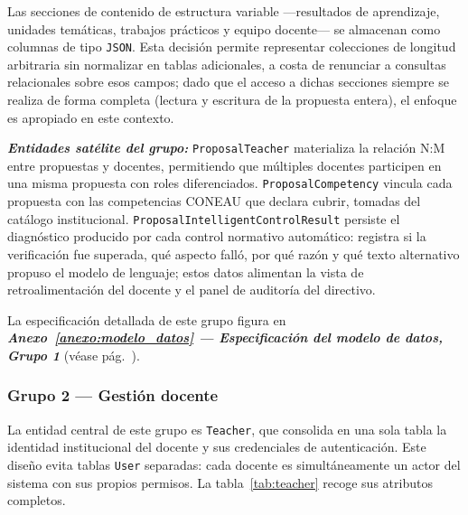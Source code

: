 Las secciones de contenido de estructura variable ---resultados de aprendizaje,
unidades temáticas, trabajos prácticos y equipo docente--- se almacenan como
columnas de tipo \texttt{JSON}. Esta decisión permite representar colecciones de
longitud arbitraria sin normalizar en tablas adicionales, a costa de renunciar a
consultas relacionales sobre esos campos; dado que el acceso a dichas secciones
siempre se realiza de forma completa (lectura y escritura de la propuesta entera),
el enfoque es apropiado en este contexto.

\textbf{\textit{Entidades satélite del grupo:}} \texttt{ProposalTeacher} materializa la relación N:M entre propuestas y docentes,
permitiendo que múltiples docentes participen en una misma propuesta con roles
diferenciados. \texttt{ProposalCompetency} vincula cada propuesta con las
competencias CONEAU que declara cubrir, tomadas del catálogo institucional.
\texttt{ProposalIntelligentControlResult} persiste el diagnóstico producido por
cada control normativo automático: registra si la verificación fue superada,
qué aspecto falló, por qué razón y qué texto alternativo propuso el modelo de
lenguaje; estos datos alimentan la vista de retroalimentación del docente y el
panel de auditoría del directivo.

La especificación detallada de este grupo figura en \textbf{\textit{Anexo~\ref{anexo:modelo_datos} — Especificación del modelo de datos, Grupo 1}} (véase pág.~\pageref{anexo:grupo1_modelo_datos}).

\subsubsection*{Grupo 2 — Gestión docente}

La entidad central de este grupo es \texttt{Teacher}, que consolida en una
sola tabla la identidad institucional del docente y sus credenciales de
autenticación. Este diseño evita tablas \texttt{User} separadas: cada docente
es simultáneamente un actor del sistema con sus propios permisos. La
tabla~\ref{tab:teacher} recoge sus atributos completos.

